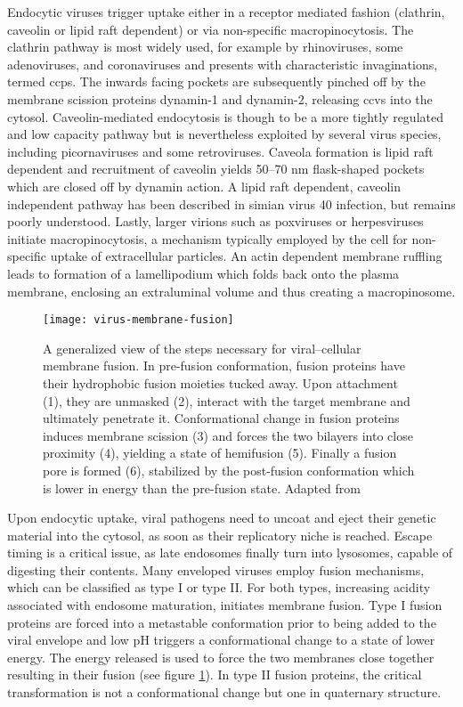 Endocytic viruses trigger uptake either in a receptor mediated fashion (clathrin, caveolin or lipid raft dependent) or via non-specific macropinocytosis. The clathrin pathway is most widely used, for example by rhinoviruses, some adenoviruses, and coronaviruses and presents with characteristic invaginations, termed \glspl{ccp}. The inwards facing pockets are subsequently pinched off by the membrane scission proteins dynamin-1 and dynamin-2, releasing \glspl{ccv} into the cytosol. Caveolin-mediated endocytosis is though to be a more tightly regulated and low capacity pathway but is nevertheless exploited by several virus species, including picornaviruses and some retroviruses. Caveola formation is lipid raft dependent and recruitment of caveolin yields 50--70 nm flask-shaped pockets which are closed off by dynamin action. A lipid raft dependent, caveolin independent pathway has been described in simian virus 40 infection, but remains poorly understood. Lastly, larger virions such as poxviruses or herpesviruses initiate macropinocytosis, a mechanism typically employed by the cell for non-specific uptake of extracellular particles. An actin dependent membrane ruffling leads to formation of a lamellipodium which folds back onto the plasma membrane, enclosing an extraluminal volume and thus creating a macropinosome.

\begin{figure}
  \centering
  \texttt{[image: virus-membrane-fusion]}
  \caption[A generalized view of the steps necessary for viral--cellular membrane fusion]{A generalized view of the steps necessary for viral--cellular membrane fusion. In pre-fusion conformation, fusion proteins have their hydrophobic fusion moieties tucked away. Upon attachment (1), they are unmasked (2), interact with the target membrane and ultimately penetrate it. Conformational change in fusion proteins induces membrane scission (3) and forces the two bilayers into close proximity (4), yielding a state of hemifusion (5). Finally a fusion pore is formed (6), stabilized by the post-fusion conformation which is lower in energy than the pre-fusion state. Adapted from \cite{Hulo2011}}
  \label{fig:virus-membrane-fusion}
\end{figure}

Upon endocytic uptake, viral pathogens need to uncoat and eject their genetic material into the cytosol, as soon as their replicatory niche is reached. Escape timing is a critical issue, as late endosomes finally turn into lysosomes, capable of digesting their contents. Many enveloped viruses employ fusion mechanisms, which can be classified as type I or type II. For both types, increasing acidity associated with endosome maturation, initiates membrane fusion. Type I fusion proteins are forced into a metastable conformation prior to being added to the viral envelope and low pH triggers a conformational change to a state of lower energy. The energy released is used to force the two membranes close together resulting in their fusion (see figure \ref{fig:virus-membrane-fusion}). In type II fusion proteins, the critical transformation is not a conformational change but one in quaternary structure.

